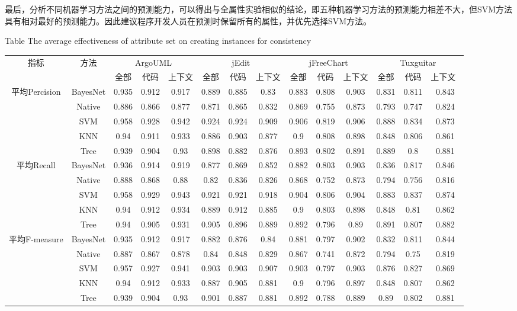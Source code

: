 最后，分析不同机器学习方法之间的预测能力，可以得出与全属性实验相似的结论，即五种机器学习方法的预测能力相差不大，但SVM方法具有相对最好的预测能力。因此建议程序开发人员在预测时保留所有的属性，并优先选择SVM方法。

\begin{sidewaystable} [htbp]
{Table$\!$}
{The average effectiveness of attribute set on creating instances for consistency}
\vspace{0.5em}
\centering
\wuhao
\begin{tabular}{cccccccccccccc}
\toprule[1.5pt]
\multirow{2}{*}{指标}&\multirow{2}{*}{方法}&\multicolumn{3}{c}{ArgoUML}&\multicolumn{3}{c}{jEdit}&\multicolumn{3}{c}{jFreeChart}&\multicolumn{3}{c}{Tuxguitar}\\
\cline{3-14}
&&{全部}&{代码}&{上下文}&{全部}&{代码}&{上下文}&{全部}&{代码}&{上下文}&{全部}&{代码}&{上下文}~\\
\midrule[1pt]
\multirow{5}{*}{平均Percision}
&BayesNet&	0.935&	0.912&	0.917&		0.889&	0.885&	0.83&		0.883&	0.808&	0.903&		0.831&	0.811&	0.843\\
&Native&	0.886&	0.866&	0.877&		0.871&	0.865&	0.832&		0.869&	0.755&	0.873&		0.793&	0.747&	0.824\\
&SVM&	0.958&	0.928&	0.942&		0.924&	0.924&	0.909&		0.906&	0.819&	0.906&		0.888&	0.834&	0.873\\
&KNN&	0.94&	0.911&	0.933&		0.886&	0.903&	0.877&		0.9	&0.808&	0.898&		0.848&	0.806&	0.861\\
&Tree&	0.939&	0.904&	0.93&		0.898&	0.882&	0.876&		0.893&	0.802&	0.891&		0.889&	0.8&	0.881\\
\hline
\multirow{5}{*}{平均Recall}
&BayesNet&	0.936&	0.914&	0.919&		0.877&	0.869&	0.852&		0.882&	0.803&	0.903&		0.836&	0.817&	0.846\\
&Native&	0.888&	0.868&	0.88&		0.82&	0.836&	0.826&		0.868&	0.752&	0.873&		0.794&	0.756&	0.816\\
&SVM&	0.958&	0.929&	0.943&		0.921&	0.921&	0.918&		0.904&	0.806&	0.904&		0.883&	0.837&	0.874\\
&KNN&	0.94&	0.912&	0.934&		0.889&	0.912&	0.885&		0.9&	0.803&	0.898&		0.848&	0.81&	0.862\\
&Tree&	0.94&	0.905&	0.931&		0.905&	0.896&	0.889&		0.892&	0.796&	0.89&		0.891&	0.807&	0.882\\
\hline
\multirow{5}{*}{平均F-measure}
&BayesNet&	0.935&	0.912&	0.917&		0.882&	0.876&	0.84&		0.881&	0.797&	0.902&		0.832&	0.811&	0.844\\
&Native&	0.887&	0.867&	0.878&		0.84&	0.848&	0.829&		0.867&	0.741&	0.872&		0.794&	0.75&	0.819\\
&SVM&	0.957&	0.927&	0.941&		0.903&	0.903&	0.907&		0.903&	0.797&	0.903&		0.876&	0.827&	0.869\\
&KNN&	0.94&	0.912&	0.933&		0.887&	0.905&	0.881&		0.9&	0.796&	0.897&		0.848&	0.807&	0.862\\
&Tree&	0.939&	0.904&	0.93&		0.901&	0.887&	0.881&		0.892&	0.788&	0.889&		0.89&	0.802&	0.881\\
\bottomrule[1.5pt]
\end{tabular}
\end{sidewaystable} 

